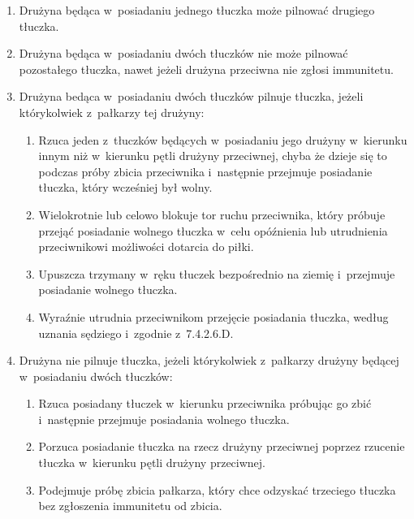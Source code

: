 \documentclass[12pt,a4paper]{article}
\begin{document}
\begin{enumerate}
	\item
	      Drużyna będąca w~posiadaniu jednego tłuczka może pilnować drugiego
	      tłuczka.
	\item
	      Drużyna będąca w~posiadaniu dwóch tłuczków nie może pilnować
	      pozostałego tłuczka, nawet jeżeli drużyna przeciwna nie zgłosi
	      immunitetu.
	\item
	      Drużyna bedąca w~posiadaniu dwóch tłuczków pilnuje tłuczka, jeżeli
	      którykolwiek z~pałkarzy tej drużyny:

	      \begin{enumerate}
		      \item
		            Rzuca jeden z~tłuczków będących w~posiadaniu jego drużyny w~kierunku
		            innym niż w~kierunku pętli drużyny przeciwnej, chyba że dzieje się
		            to podczas próby zbicia przeciwnika i~następnie przejmuje posiadanie
		            tłuczka, który wcześniej był wolny.
		      \item
		            Wielokrotnie lub celowo blokuje tor ruchu przeciwnika, który próbuje
		            przejąć posiadanie wolnego tłuczka w~celu opóźnienia lub utrudnienia
		            przeciwnikowi możliwości dotarcia do piłki.
		      \item
		            Upuszcza trzymany w~ręku tłuczek bezpośrednio na ziemię i~przejmuje
		            posiadanie wolnego tłuczka.
		      \item
		            Wyraźnie utrudnia przeciwnikom przejęcie posiadania tłuczka, według
		            uznania sędziego i~zgodnie z~7.4.2.6.D.
	      \end{enumerate}
	\item
	      Drużyna nie pilnuje tłuczka, jeżeli którykolwiek z~pałkarzy drużyny
	      będącej w~posiadaniu dwóch tłuczków:

	      \begin{enumerate}
		      \item
		            Rzuca posiadany tłuczek w~kierunku przeciwnika próbując go zbić i~następnie przejmuje posiadania wolnego tłuczka.
		      \item
		            Porzuca posiadanie tłuczka na rzecz drużyny przeciwnej poprzez
		            rzucenie tłuczka w~kierunku pętli drużyny przeciwnej.
		      \item
		            Podejmuje próbę zbicia pałkarza, który chce odzyskać trzeciego
		            tłuczka bez zgłoszenia immunitetu od zbicia.
	      \end{enumerate}
\end{enumerate}
\end{document}
